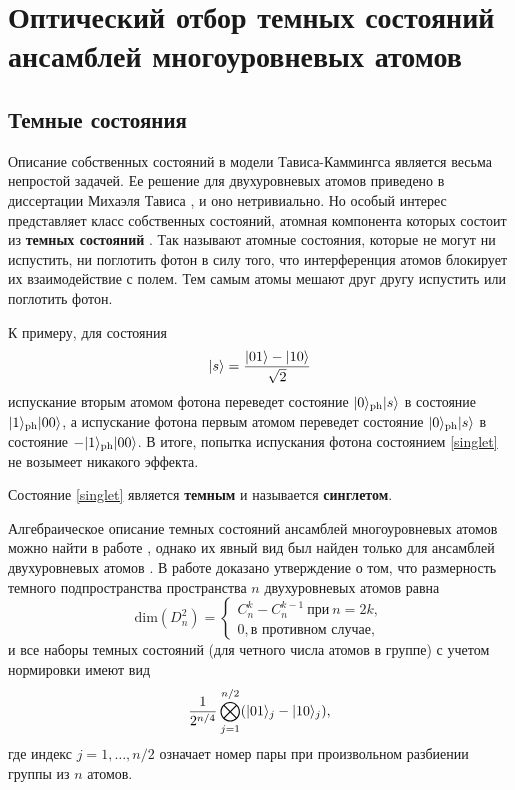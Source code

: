 \chapter{Оптический отбор темных состояний ансамблей многоуровневых атомов}\label{ch:ch3}

\section{Темные состояния}\label{subsec:ch3/sect1}

Описание собственных состояний в модели Тависа-Каммингса является весьма непростой задачей. Ее решение для двухуровневых атомов приведено в диссертации Михаэля Тависа \cite{tc_a_study}, и оно нетривиально. Но особый интерес представляет класс собственных состояний, атомная компонента которых состоит из \textbf{темных состояний} \cite{dark_states_dimension}. Так называют атомные состояния, которые не могут ни испустить, ни поглотить фотон в силу того, что интерференция атомов блокирует их взаимодействие с полем. Тем самым атомы мешают друг другу испустить или поглотить фотон.

К примеру, для состояния
\begin{equation}\label{singlet}
	|s\rangle = \frac{|01\rangle - |10\rangle}{\sqrt{2}}
\end{equation}
испускание вторым атомом фотона переведет состояние  $|0\rangle_{\text{ph}}|s\rangle$ в состояние $|1\rangle_{\text{ph}}|00\rangle$, а испускание фотона первым атомом переведет состояние  $|0\rangle_{\text{ph}}|s\rangle$ в состояние $-|1\rangle_{\text{ph}}|00\rangle$. В итоге, попытка испускания фотона состоянием \eqref{singlet} не возымеет никакого эффекта.

Состояние \eqref{singlet} является \textbf{темным} и называется \textbf{синглетом}.

Алгебраическое описание темных состояний ансамблей многоуровневых атомов можно найти в работе \cite{dark_states_kok}, однако их явный вид был найден только для ансамблей двухуровневых атомов \cite{dark_states_dimension}. В работе \cite{dark_states_dimension} доказано утверждение о том, что размерность темного подпространства пространства $n$ двухуровневых атомов равна
\[
\mathrm{dim}(D_{n}^2) =
\begin{cases}
	C_{n}^{k} - C_{n}^{k-1}~\text{при}~n = 2k, \\
	0, \text{в противном случае},
\end{cases}
\]
и все наборы темных состояний (для четного числа атомов в группе) с учетом нормировки имеют вид 
\[
\frac{1}{2^{n/4}}\bigotimes_{j=1}^{n/2}(|01\rangle_{j}-|10\rangle_{j}),
\]
где индекс $j = 1,\dots, n/2$ означает номер пары при произвольном разбиении группы из $n$ атомов.

